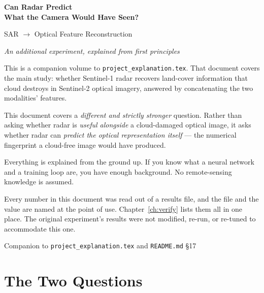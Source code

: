 \documentclass[11pt,a4paper]{report}
\newcommand{\file}[1]{\texttt{\small #1}}
\begin{document}
\begin{titlepage}
\centering
\vspace*{2.0cm}
{\Huge\bfseries Can Radar Predict\\[2mm] What the Camera Would Have Seen?\par}
\vspace{0.8cm}
{\LARGE SAR $\rightarrow$ Optical Feature Reconstruction\par}
\vspace{0.4cm}
{\large\itshape An additional experiment, explained from first principles\par}
\vspace{1.8cm}

\begin{minipage}{0.86\textwidth}
\small
This is a companion volume to \file{project\_explanation.tex}. That document
covers the main study: whether Sentinel-1 radar recovers land-cover information
that cloud destroys in Sentinel-2 optical imagery, answered by concatenating the
two modalities' features.

\medskip
This document covers a \emph{different and strictly stronger} question. Rather
than asking whether radar is \emph{useful alongside} a cloud-damaged optical
image, it asks whether radar can \emph{predict the optical representation
itself} --- the numerical fingerprint a cloud-free image would have produced.

\medskip
Everything is explained from the ground up. If you know what a neural network
and a training loop are, you have enough background. No remote-sensing knowledge
is assumed.

\medskip
Every number in this document was read out of a results file, and the file and
the value are named at the point of use. Chapter~\ref{ch:verify} lists them all
in one place. The original experiment's results were not modified, re-run, or
re-tuned to accommodate this one.
\end{minipage}

\vfill
{\small Companion to \file{project\_explanation.tex} and \file{README.md} \S17\par}
\vspace{1.0cm}
\end{titlepage}

\tableofcontents
\clearpage

\chapter{The Two Questions}
\label{ch:two}
\end{document}
